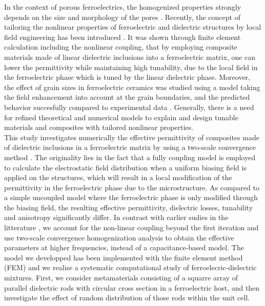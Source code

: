 \documentclass[%
 aip,
 amsmath,amssymb,
 reprint,%
linenumbers
]{revtex4-1}
\newcommand{\co}[1]{\textcolor{correction}{#1}}
\begin{document}
  In the context of porous ferroelectrics,
   the homogenized properties strongly depends on the size and morphology of the pores
    \cite{okazaki_effects_1973,stanculescu_study_2015}.
    Recently, the concept of tailoring the nonlinear properties of ferroelectric
     and dielectric structures by local field engineering has been introduced \cite{padurariu_tailoring_2012,padurariu_field-dependent_2012,cazacu_tunable_2013}.
      It was shown through finite element calculation including the nonlinear coupling, that by employing
      composite materials made of linear dielectric inclusions into a ferroelectric matrix, one can lower the permittivity while maintaining
      high tunability, due to the local field in the ferroelectric phase which is tuned by the linear dielectric phase.
Moreover, the effect of grain sizes in ferroelectric
ceramics was studied using a model taking the field enhancement into account at
the grain boundaries, and the predicted behavior succesfully compared to experimental data \cite{padurariu_field-dependent_2012}.
Generally, there is a need for refined theoretical and numerical models to explain and design
tunable materials and composites with tailored nonlinear properties.
\\
This study investigates \co{numerically} the effective permittivity of composites made of
 dielectric inclusions in a ferroelectric matrix
by using a two-scale convergence method \cite{allaire_homogenization_1992,
 guenneau_homogenization_2000}.
The originality lies in the fact that a fully coupling model is employed to
calculate the electrostatic field distribution when a uniform biasing field is
applied on the structures, which will result in a local modification of the permittivity
in the ferroelectric phase due to the microstructure. As compared to a simple uncoupled model where the
ferroelectric phase is only modified through the biasing field,
the resulting effective permittivity, dielectric losses, tunability and
anisotropy significantly differ. \co{In contrast with} earlier sudies in the
litterature \cite{padurariu_tailoring_2012,padurariu_field-dependent_2012}, we account for
the non-linear coupling beyond the first iteration and use two-scale
convergence homogenization analysis to obtain the effective parameters at
higher frequencies, instead of a capacitance-based model.
\co{The model we developped has been implemented with the finite element method (FEM)
and we realise a systematic computational study of ferroelecric-dielectric mixtures.
First, we consider} metamaterials consisting of a squarre array of parallel
dielectric rods with circular cross section in a ferroelectric host, and
then investigate the effect of random distribution of those rods within the unit cell.
\end{document}
